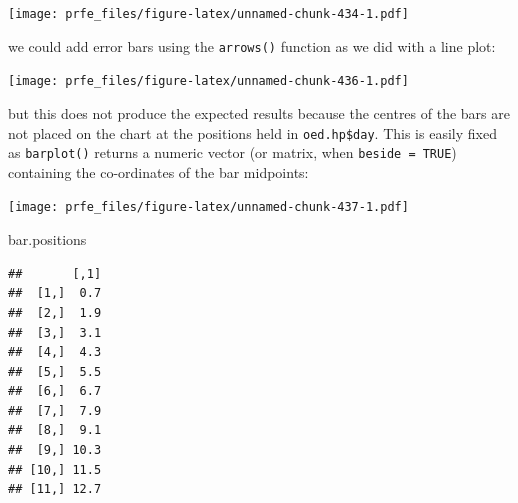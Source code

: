 \documentclass[12pt,a4paper]{book}
\newenvironment{Shaded}{\begin{snugshade}}{\end{snugshade}}
\newcommand{\DataTypeTok}[1]{\textcolor[rgb]{0.13,0.29,0.53}{#1}}
\newcommand{\DecValTok}[1]{\textcolor[rgb]{0.00,0.00,0.81}{#1}}
\newcommand{\FloatTok}[1]{\textcolor[rgb]{0.00,0.00,0.81}{#1}}
\newcommand{\KeywordTok}[1]{\textcolor[rgb]{0.13,0.29,0.53}{\textbf{#1}}}
\newcommand{\NormalTok}[1]{#1}
\newcommand{\OperatorTok}[1]{\textcolor[rgb]{0.81,0.36,0.00}{\textbf{#1}}}
\newcommand{\StringTok}[1]{\textcolor[rgb]{0.31,0.60,0.02}{#1}}
\theoremstyle{definition}
\theoremstyle{definition}
\theoremstyle{definition}
\theoremstyle{remark}
\begin{document}
\texttt{[image: prfe\_files/figure-latex/unnamed-chunk-434-1.pdf]}

we could add error bars using the \texttt{arrows()} function as we did
with a line plot:

\begin{Shaded}
\end{Shaded}

\texttt{[image: prfe\_files/figure-latex/unnamed-chunk-436-1.pdf]}

but this does not produce the expected results because the centres of
the bars are not placed on the chart at the positions held in
\texttt{oed.hp\$day}. This is easily fixed as \texttt{barplot()} returns
a numeric vector (or matrix, when \texttt{beside\ =\ TRUE}) containing
the co-ordinates of the bar midpoints:

\begin{Shaded}
\end{Shaded}

\texttt{[image: prfe\_files/figure-latex/unnamed-chunk-437-1.pdf]}

\begin{Shaded}
\begin{Highlighting}[]
\NormalTok{bar.positions}
\end{Highlighting}
\end{Shaded}

\begin{verbatim}
##       [,1]
##  [1,]  0.7
##  [2,]  1.9
##  [3,]  3.1
##  [4,]  4.3
##  [5,]  5.5
##  [6,]  6.7
##  [7,]  7.9
##  [8,]  9.1
##  [9,] 10.3
## [10,] 11.5
## [11,] 12.7
\end{verbatim}
\end{document}
